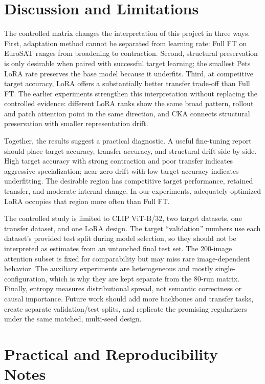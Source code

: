 \documentclass[conference]{IEEEtran}
\begin{document}
\section{Discussion and Limitations}
The controlled matrix changes the interpretation of this project in three ways. First, adaptation method cannot be separated from learning rate: Full FT on EuroSAT ranges from broadening to contraction. Second, structural preservation is only desirable when paired with successful target learning; the smallest Pets LoRA rate preserves the base model because it underfits. Third, at competitive target accuracy, LoRA offers a substantially better transfer trade-off than Full FT. The earlier experiments strengthen this interpretation without replacing the controlled evidence: different LoRA ranks show the same broad pattern, rollout and patch attention point in the same direction, and CKA connects structural preservation with smaller representation drift.

Together, the results suggest a practical diagnostic. A useful fine-tuning report should place target accuracy, transfer accuracy, and structural drift side by side. High target accuracy with strong contraction and poor transfer indicates aggressive specialization; near-zero drift with low target accuracy indicates underfitting. The desirable region has competitive target performance, retained transfer, and moderate internal change. In our experiments, adequately optimized LoRA occupies that region more often than Full FT.

The controlled study is limited to CLIP ViT-B/32, two target datasets, one transfer dataset, and one LoRA design. The target ``validation'' numbers use each dataset's provided test split during model selection, so they should not be interpreted as estimates from an untouched final test set. The 200-image attention subset is fixed for comparability but may miss rare image-dependent behavior. The auxiliary experiments are heterogeneous and mostly single-configuration, which is why they are kept separate from the 80-run matrix. Finally, entropy measures distributional spread, not semantic correctness or causal importance. Future work should add more backbones and transfer tasks, create separate validation/test splits, and replicate the promising regularizers under the same matched, multi-seed design.

\section{Practical and Reproducibility Notes}
\end{document}
